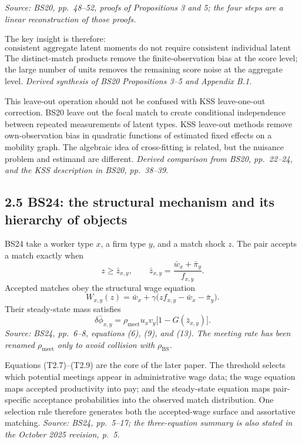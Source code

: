 \documentclass[11pt]{article}
\begin{document}
\textit{Source: BS20, pp.\ 48--52, proofs of Propositions 3 and 5; the four
steps are a linear reconstruction of those proofs.}

The key insight is therefore:
\[
\boxed{
\text{consistent aggregate latent moments do not require consistent
individual latent types.}
}
\tag{T2.6}
\]
The distinct-match products remove the finite-observation bias at the score
level; the large number of units removes the remaining score noise at the
aggregate level.  \textit{Derived synthesis of BS20 Propositions 3--5 and
Appendix B.1.}

This leave-out operation should not be confused with KSS leave-one-out
correction.  BS20 leave out the focal match to create conditional independence
between repeated measurements of latent types.  KSS leave-out methods remove
own-observation bias in quadratic functions of estimated fixed effects on a
mobility graph.  The algebraic idea of cross-fitting is related, but the
nuisance problem and estimand are different.
\textit{Derived comparison from BS20, pp.\ 22--24, and the KSS description in
BS20, pp.\ 38--39.}

\subsection{2.5 BS24: the structural mechanism and its hierarchy of objects}

BS24 take a worker type \(x\), a firm type \(y\), and a match shock \(z\).
The pair accepts a match exactly when
\[
z\geq\bar z_{x,y},
\qquad
\bar z_{x,y}
=
\frac{\bar w_x+\bar\pi_y}{f_{x,y}}.
\tag{T2.7}
\]
Accepted matches obey the structural wage equation
\[
W_{x,y}(z)
=
\bar w_x
+\gamma\bigl(zf_{x,y}-\bar w_x-\bar\pi_y\bigr).
\tag{T2.8}
\]
Their steady-state mass satisfies
\[
\delta\bar\phi_{x,y}
=
\rho_{\mathrm{meet}}u_xv_y
\bigl[1-G(\bar z_{x,y})\bigr].
\tag{T2.9}
\]
\textit{Source: BS24, pp.\ 6--8, equations (6), (9), and (13).  The meeting
rate has been renamed \(\rho_{\mathrm{meet}}\) only to avoid collision with
\(\rho_{\mathrm{BS}}\).}

Equations (T2.7)--(T2.9) are the core of the later paper.  The threshold
selects which potential meetings appear in administrative wage data; the wage
equation maps accepted productivity into pay; and the steady-state equation
maps pair-specific acceptance probabilities into the observed match
distribution.  One selection rule therefore generates both the accepted-wage
surface and assortative matching.
\textit{Source: BS24, pp.\ 5--17; the three-equation summary is also stated in
the October 2025 revision, p.\ 5.}
\end{document}
